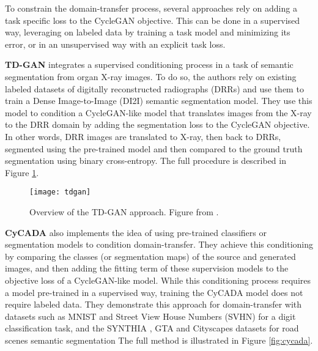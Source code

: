 To constrain the domain-transfer process, several approaches rely on adding a task specific loss to the \ac{CycleGAN} objective. This can be done in a supervised way, leveraging on labeled data by training a task model and minimizing its error, or in an unsupervised way with an explicit task loss.

\textbf{TD-GAN} \citep{Zhang2018c} integrates a supervised conditioning process in a task of semantic segmentation from organ X-ray images. To do so, the authors rely on existing labeled datasets of digitally reconstructed radiographs (DRRs) and use them to train a Dense Image-to-Image (DI2I) \citep{Huang2018} semantic segmentation model. They use this model to condition a \ac{CycleGAN}-like model that translates images from the X-ray to the DRR domain by adding the segmentation loss to the \ac{CycleGAN} objective. In other words, DRR images are translated to X-ray, then back to DRRs, segmented using the pre-trained model and then compared to the ground truth segmentation using binary cross-entropy.  The full procedure is described in Figure \ref{fig:tdgan}.

\begin{figure}
	\centering
	\texttt{[image: tdgan]}
	\caption{Overview of the TD-GAN approach. Figure from \citet{Zhang2018c}.}
	\label{fig:tdgan}
\end{figure}

\textbf{CyCADA} \citep{Hoffman2018} also implements the idea of using pre-trained classifiers or segmentation models to condition domain-transfer.  They achieve this conditioning by comparing the classes (or segmentation maps) of the source and generated images, and then adding the fitting term of these supervision models to the objective loss of a \ac{CycleGAN}-like model. While this conditioning process requires a model pre-trained in a supervised way, training the CyCADA model does not require labeled data. They demonstrate this approach for domain-transfer with datasets such as \ac{MNIST} \citep{LeCun1998a} and Street View House Numbers (SVHN) \citep{Netzer2011} for a digit classification task, and the SYNTHIA \citep{Ros2016}, GTA \citep{Richter2016} and Cityscapes \citep{Cordts2015} datasets for road scenes semantic segmentation The full method is illustrated in Figure \ref{fig:cycada}.


